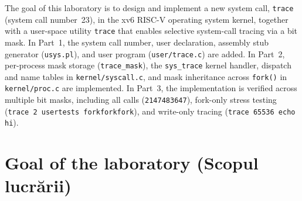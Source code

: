 \documentclass{../latex/utmreport}
\begin{document}
\makeutmreporttitlepage
\tableofcontents
\clearpage
\begin{utmabstract}[Abstract]
The goal of this laboratory is to design and implement a new system call, \texttt{trace} (system call number~23), in the xv6 RISC-V operating system kernel, together with a user-space utility \texttt{trace} that enables selective system-call tracing via a bit mask. In Part~1, the system call number, user declaration, assembly stub generator (\texttt{usys.pl}), and user program (\texttt{user/trace.c}) are added. In Part~2, per-process mask storage (\texttt{trace\_mask}), the \texttt{sys\_trace} kernel handler, dispatch and name tables in \texttt{kernel/syscall.c}, and mask inheritance across \texttt{fork()} in \texttt{kernel/proc.c} are implemented. In Part~3, the implementation is verified across multiple bit masks, including all calls (\texttt{2147483647}), fork-only stress testing (\texttt{trace 2 usertests forkforkfork}), and write-only tracing (\texttt{trace 65536 echo hi}).
\end{utmabstract}
\utmintroduction

\section*{Goal of the laboratory (Scopul lucrării)}
\end{document}

